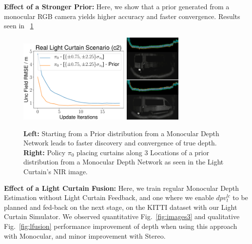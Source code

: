 \textbf{Effect of a Stronger Prior:} Here, we show that a prior generated from a monocular RGB camera yields higher accuracy and faster convergence. Results seen in ~\ref{fig:prior} 

\begin{figure}[h]
  \centering
  \begin{minipage}{0.5\textwidth}
      \centering
      \includegraphics[width=0.49\textwidth]{figures/figure_X.pdf}
      \includegraphics[width=0.25\textwidth]{figures/placement3.png}
  \end{minipage}\hfill
  \centering
  \caption{ \textbf{Left:} Starting from a Prior distribution from a Monocular Depth Network leads to faster discovery and convergence of true depth. \textbf{Right:} Policy $\pi_{0}$ placing curtains along 3 Locations of a prior distribution from a Monocular Depth Network as seen in the Light Curtain's NIR image.}
  \label{fig:prior} 
\end{figure}

\textbf{Effect of a Light Curtain Fusion:} Here, we train regular Monocular Depth Estimation without Light Curtain Feedback, and one where we enable $dpv_{t}^{lc}$ to be planned and fed-back on the next stage, on the KITTI dataset with our Light Curtain Simulator. We observed quantitative Fig.~\ref{fig:images3} and qualitative Fig.~\ref{fig:lfusion} performance improvement of depth when using this approach with Monocular, and minor improvement with Stereo.

